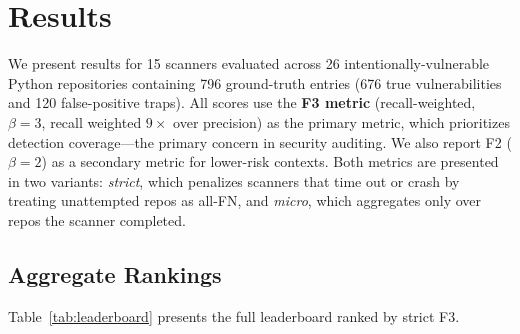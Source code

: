 \section{Results}
\label{sec:results}

We present results for 15 scanners evaluated across 26 intentionally-vulnerable Python repositories containing 796 ground-truth entries (676 true vulnerabilities and 120 false-positive traps).
All scores use the \textbf{F3 metric} (recall-weighted, $\beta{=}3$, recall weighted $9\times$ over precision) as the primary metric, which prioritizes detection coverage---the primary concern in security auditing.
We also report F2 ($\beta{=}2$) as a secondary metric for lower-risk contexts.
Both metrics are presented in two variants: \emph{strict}, which penalizes scanners that time out or crash by treating unattempted repos as all-FN, and \emph{micro}, which aggregates only over repos the scanner completed.

\subsection{Aggregate Rankings}
\label{sec:results:aggregate}

Table~\ref{tab:leaderboard} presents the full leaderboard ranked by strict F3.

